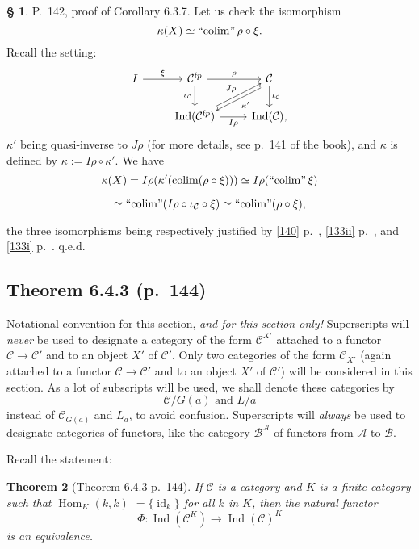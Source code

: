 \documentclass[12pt]{article}
\newtheorem{thm}{Theorem}
\theoremstyle{remark}
\theoremstyle{definition}
\newtheorem{s}[thm]{\S}
\newcommand{\nn}{\noindent}
\newcommand{\A}{\mathcal A}
\newcommand{\B}{\mathcal B}
\newcommand{\C}{\mathcal C}
\DeclareMathOperator*{\colim}{colim}
\DeclareMathOperator*{\ic}{``\!\colim\!"}
\DeclareMathOperator{\id}{id}
\DeclareMathOperator{\Hom}{Hom}
\DeclareMathOperator{\Ind}{Ind}
\begin{document}
%

\begin{s} P.~142, proof of Corollary 6.3.7. Let us check the isomorphism 
$$
\kappa(X)\simeq\ic\rho\circ\xi. 
$$ 
Recall the setting:
$$
\begin{tikzcd}
I\ar{r}{\xi}&\C^{\text fp}\ar{d}[swap]{\iota_\C}\ar{r}{\rho}&\C\ar[yshift=-.9ex]{dl}{\kappa'}\ar{d}{\iota_\C}\\ 
{}&\Ind(\C^{\text fp})\ar{ur}{J\rho}\ar{r}[swap]{I\rho}&\Ind(\C),
\end{tikzcd}
$$ 
$\kappa'$ being quasi-inverse to $J\rho$ (for more details, see p.~141 of the book), and $\kappa$ is defined by $\kappa:=I\rho\circ\kappa'$. We have 
$$
\kappa(X)=I\rho(\kappa'(\colim(\rho\circ\xi)))\simeq I\rho(\ic\xi)
$$

$$
\simeq\ic(I\rho\circ\iota_\C\circ\xi)\simeq\ic(\rho\circ\xi), 
$$ 

\nn the three isomorphisms being respectively justified by \eqref{140} p.~\pageref{140}, \eqref{133ii} p.~\pageref{133ii}, and \eqref{133i} p.~\pageref{133i}. q.e.d.
\end{s}


\subsection{Theorem 6.4.3 (p.~144)}

Notational convention for this section, {\em and for this section only!} Superscripts will {\em never} be used to designate a category of the form $\C^{X'}$ attached to a functor $\C\to\C'$ and to an object $X'$ of $\C'$. Only two categories of the form $\C_{X'}$ (again attached to a functor $\C\to\C'$ and to an object $X'$ of $\C'$) will be considered in this section. As a lot of subscripts will be used, we shall denote these categories by 
%
\begin{equation}\label{slice}
\C/G(a)\text{ and }L/a
\end{equation}
%
instead of $\C_{G(a)}$ and $L_a$, to avoid confusion. Superscripts will {\em always} be used to designate categories of functors, like the category $\B^\A$ of functors from $\A$ to $\B$. 

Recall the statement: 
%
\begin{thm}[Theorem 6.4.3 p.~144]\label{643} 
If $\C$ is a category and $K$ is a finite category such that $\Hom_K(k,k)$ $=\{\id_k\}$ for all $k$ in $K$, then the natural functor 
$$
\Phi:\Ind(\C^K)\to\Ind(\C)^K
$$ 
is an equivalence.
\end{thm}
\end{document}

